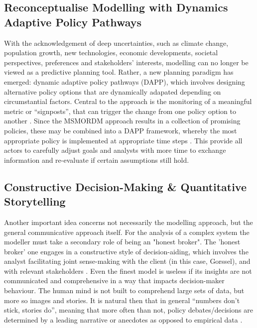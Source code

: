 \subsection{Reconceptualise Modelling with Dynamics Adaptive Policy Pathways}

With the acknowledgement of deep uncertainties, such as climate change, population growth, new technologies, economic developments, societal perspectives, preferences and stakeholders’ interests, modelling can no longer be viewed as a predictive planning tool. Rather, a new planning paradigm has emerged: dynamic adaptive policy pathways (DAPP), which involves designing alternative policy options that are dynamically adapated depending on circumstantial factors. Central to the approach is the monitoring of a meaningful metric or “signposts”, that can trigger the change from one policy option to another \parencite{haasnoot_dynamic_2013}. Since the MSMORDM approach results in a collection of promising policies, these may be combined into a DAPP framework, whereby the most appropriate policy is implemented at appropriate time steps \parencite{kwakkel_developing_2015}. This provide all actors to carefully adjust goals and analysts with more time to exchange information and re-evaluate if certain assumptions still hold. 

\subsection{Constructive Decision-Making \& Quantitative Storytelling}

Another important idea concerns not necessarily the modelling approach, but the general communicative approach itself. For the analysis of a complex system the modeller must take a secondary role of being an "honest broker". The 'honest broker' one engages in a constructive style of decision-aiding, which involves the analyst facilitating joint sense-making with the client (in this case, Gorssel), and with relevant stakeholders \parencite{tsoukias_decision_2008}. Even the finest model is useless if its insights are not communicated and comprehensive in a way that impacts decision-maker behaviour. The human mind is not built to comprehend large sets of data, but more so images and stories. It is natural then that in general “numbers don’t stick, stories do”, meaning that more often than not, policy debates/decisions are determined by a leading narrative or anecdotes as opposed to empirical data \parencite{kettl_making_2016}.  

